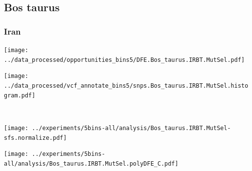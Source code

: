\subsection{Bos taurus}

\subsubsection{Iran}

\begin{minipage}{0.49\linewidth}
    \texttt{[image: ../data\_processed/opportunities\_bins5/DFE.Bos\_taurus.IRBT.MutSel.pdf]}
\end{minipage}
\begin{minipage}{0.49\linewidth}
    \texttt{[image: ../data\_processed/vcf\_annotate\_bins5/snps.Bos\_taurus.IRBT.MutSel.histogram.pdf]}
\end{minipage}
\\
\begin{minipage}{0.49\linewidth}
    \texttt{[image: ../experiments/5bins-all/analysis/Bos\_taurus.IRBT.MutSel-sfs.normalize.pdf]}
\end{minipage}
\begin{minipage}{0.4\linewidth}
    \texttt{[image: ../experiments/5bins-all/analysis/Bos\_taurus.IRBT.MutSel.polyDFE\_C.pdf]}
\end{minipage}
